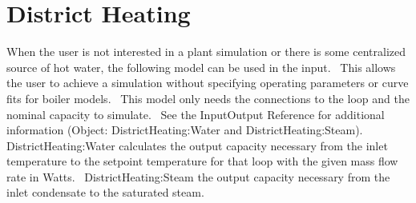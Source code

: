 \section{District Heating }\label{district-heating}

When the user is not interested in a plant simulation or there is some centralized source of hot water, the following model can be used in the input.~ This allows the user to achieve a simulation without specifying operating parameters or curve fits for boiler models.~ This model only needs the connections to the loop and the nominal capacity to simulate.~ See the InputOutput Reference for additional information (Object: DistrictHeating:Water and DistrictHeating:Steam).~ DistrictHeating:Water calculates the output capacity necessary from the inlet temperature to the setpoint temperature for that loop with the given mass flow rate in Watts.~ DistrictHeating:Steam the output capacity necessary from the inlet condensate to the saturated steam. 
